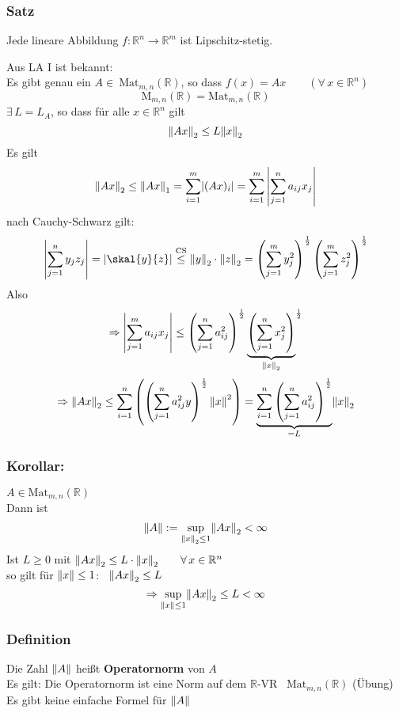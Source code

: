 \subsubsection{Satz} %
\label{ssub:satz}
Jede lineare Abbildung $f:\mathbb{R}^n \to \mathbb{R}^m$ ist Lipschitz-stetig.

 Aus LA I ist bekannt: \\
Es gibt genau ein $A \in \ \text{Mat}_{m,n}(\mathbb{R})$, so dass $f(x)=Ax \qquad (\forall\, x \in \mathbb{R}^n)$ 
\[
	\text{M}_{m,n}(\mathbb{R}) = \text{Mat}_{m,n}(\mathbb{R})
\]
$\exists \, L=L_A$, so dass für alle $x \in \mathbb{R}^n$ gilt 
\[
	\norm{Ax}_2 \leq L \norm{x}_2
\]
Es gilt 
\[
	\norm{Ax}_2 \leq \norm{Ax}_1 = \sum^{m}_{i=1} \abs{(Ax)_i} = \sum^{m}_{i=1} \left|\sum^{n}_{j=1} a_{ij}x_j \right| 
\]
nach Cauchy-Schwarz gilt:
\[
	\left| \sum^{n}_{j=1}y_jz_j \right | =\abs{\skal{y}{z}} \stackrel{\text{CS}}{\leq } \norm{y}_2 \cdot \norm{z}_2 = \left( \sum^{m}_{j=1}y_j^2 \right)^{\frac{1}{2}}
	 \left( \sum^{m}_{j=1}z_j^2 \right)^{\frac{1}{2}}
\]
Also 
\[
	\Rightarrow \left| \sum^{m}_{j=1}a_{ij}x_j \right| \leq \left( \sum^{n}_{j=1}a_{ij}^2 \right)^{\frac{1}{2}} \underset{\norm{x}_2}{\underbrace{
	\left ( \sum^{n}_{j=1}x_{j}^2 \right ) }}^{\frac{1}{2}}
\]
\[
	\Rightarrow \norm{Ax}_2 \leq \sum^{n}_{i=1} \left( \left( \sum^{n}_{j=1}a_{ij}^2y \right)^{\frac{1}{2}}\norm{x}^2 \right) = \underset{=L}{\underbrace{\sum^{n}_{i=1} \left( \sum^{n}_{j=1}a_{ij}^2 \right)^{\frac{1}{2}}}} \norm{x}_2
\] 
\bewende
\subsubsection{Korollar:} %
\label{ssub:korollar}
$A \in \text{Mat}_{m,n}(\mathbb{R})$ \\
Dann ist 
\[
	\norm{A}:= \sup\limits_{\norm{x}_2 \leq 1} \norm{Ax}_2 < \infty
\]
Ist $L \geq 0$ mit $\norm{Ax}_2 \leq L \cdot \norm{x}_2 \qquad \forall\, x \in \mathbb{R}^n$ \\ 
so gilt für $\norm{x}\leq 1$: \, $\norm{Ax}_2 \leq L$
\[
	\Rightarrow \sup\limits_{\norm{x}\leq 1}\norm{Ax}_2 \leq L < \infty
\]
 \bewende
\subsubsection[Operatornorm]{Definition} %
\label{ssub:definition}
Die Zahl $\norm{A}$ heißt {\bfseries Operatornorm} von $A$ \\
Es gilt: Die Operatornorm ist eine Norm auf dem $\mathbb{R}$-VR \, $\text{Mat}_{m,n}(\mathbb{R})$ \qquad (Übung) \\
Es gibt keine einfache Formel für $\norm{A}$

